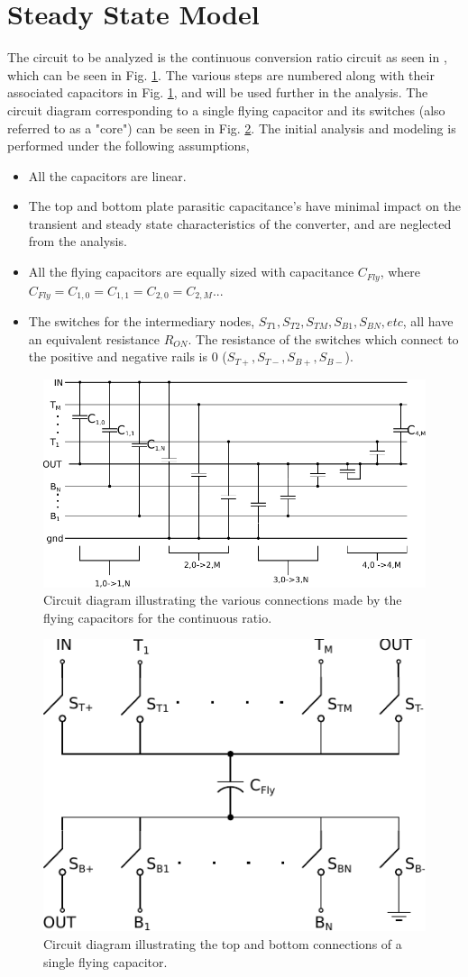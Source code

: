 \documentclass[conference]{article}
\begin{document}
	\section{Steady State Model}
	The circuit to be analyzed is the continuous conversion ratio circuit as seen in \cite{Butzen2019}, which can be seen in Fig. \ref{fig:contTop}. The various steps are numbered along with their associated capacitors in Fig. \ref{fig:contTop}, and will be used further in the analysis. The circuit diagram corresponding to a single flying capacitor and its switches (also referred to as a "core") can be seen in Fig. \ref{fig:coreCon}. The initial analysis and modeling is performed under the following assumptions,
	\begin{itemize}
		\item All the capacitors are linear.
		\item The top and bottom plate parasitic capacitance's have minimal impact on the transient and steady state characteristics of the converter, and are neglected from the analysis.
		\item All the flying capacitors are equally sized with capacitance $C_{Fly}$, where $C_{Fly} = C_{1,0} = C_{1,1} = C_{2,0} = C_{2,M} ...$
		\item The switches for the intermediary nodes, $S_{T1}, S_{T2}, S_{TM}, S_{B1}, S_{BN}, etc$, all have an equivalent resistance $R_{ON}$. The resistance of the switches which connect to the positive and negative rails is 0 ($S_{T+}, S_{T-}, S_{B+}, S_{B-}$).
	\end{itemize}
	\begin{figure}
		\centering
		\includegraphics[width=0.7\linewidth]{Figures/contRatioCircuit2.pdf}
		\caption{Circuit diagram illustrating the various connections made by the flying capacitors for the continuous ratio.}
		\label{fig:contTop}
	\end{figure}
	\begin{figure}
		\centering
		\includegraphics[width=0.4\linewidth]{Figures/contRatioCore.pdf}
		\caption{Circuit diagram illustrating the top and bottom connections of a single flying capacitor.}
		\label{fig:coreCon}
	\end{figure}
\end{document}
